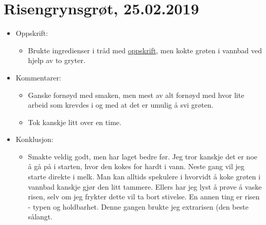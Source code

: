 \documentclass[12pt]{article}
\begin{document}
\section*{Risengrynsgr{\o}t, 25.02.2019}
\begin{itemize}
\item Oppskrift:
  \begin{itemize}
  \item Brukte ingredienser i tr{\aa}d med
    \href{https://www.melk.no/Oppskrifter/Groeter/Tradisjonsgroet/Risengrynsgroet}{oppskrift},
    men kokte gr{\o}ten i vannbad ved hjelp av to gryter. 
  \end{itemize}
\item Kommentarer:
  \begin{itemize}
  \item Ganske forn{\o}yd med smaken, men mest av alt forn{\o}yd med hvor lite arbeid som krevdes i og med at det er umulig å svi gr{\o}ten.
  \item Tok kanskje litt over en time.
  \end{itemize}
\item Konklusjon:
  \begin{itemize}
  \item Smakte veldig godt, men har laget bedre f{\o}r. Jeg tror
    kanskje det er noe {\aa} g{\aa} p{\aa} i starten, hvor den kokes for
    hardt i vann. Neste gang vil jeg starte direkte i melk. Man kan
    alltids spekulere i hvorvidt  å koke gr{\o}ten i vannbad
    kanskje gjør den litt tammere. Ellers har jeg lyst {\aa} pr{\o}ve
    {\aa} vaske risen, selv om jeg frykter dette vil ta bort
    stivelse. En annen ting er risen - typen og holdbarhet. Denne
    gangen brukte jeg extrarisen (den beste s{\aa}langt.
  \end{itemize}
\end{itemize}
\end{document}
